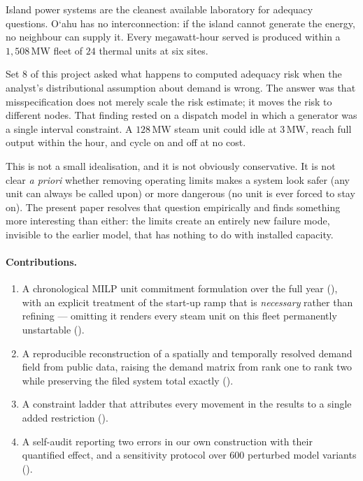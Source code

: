 \documentclass[11pt,a4paper]{article}
\theoremstyle{definition}
\theoremstyle{plain}
\theoremstyle{remark}
\newcommand{\MW}{\,\mathrm{MW}}
\newcommand{\okina}{\textquoteleft}
\newcommand{\Oahu}{O\okina ahu}
\begin{document}
Island power systems are the cleanest available laboratory for adequacy
questions. \Oahu{} has no interconnection: if the island cannot generate the
energy, no neighbour can supply it. Every megawatt-hour served is produced
within a $1{,}508\MW$ fleet of $24$ thermal units at six sites.

Set 8 of this project asked what happens to computed adequacy risk when the
analyst's distributional assumption about demand is wrong. The answer was that
misspecification does not merely scale the risk estimate; it moves the risk to
different nodes. That finding rested on a dispatch model in which a generator
was a single interval constraint. A $128\MW$ steam unit could idle at $3\MW$,
reach full output within the hour, and cycle on and off at no cost.

This is not a small idealisation, and it is not obviously conservative. It is
not clear \emph{a priori} whether removing operating limits makes a system look
safer (any unit can always be called upon) or more dangerous (no unit is ever
forced to stay on). The present paper resolves that question empirically and
finds something more interesting than either: the limits create an entirely new
failure mode, invisible to the earlier model, that has nothing to do with
installed capacity.

\paragraph{Contributions.}
\begin{enumerate}[leftmargin=1.4em,itemsep=2pt]
\item A chronological MILP unit commitment formulation over the full year
  (), with an explicit treatment of the start-up ramp that is
  \emph{necessary} rather than refining --- omitting it renders every steam unit
  on this fleet permanently unstartable ().
\item A reproducible reconstruction of a spatially and temporally resolved
  demand field from public data, raising the demand matrix from rank one to
  rank two while preserving the filed system total exactly
  ().
\item A constraint ladder that attributes every movement in the results to a
  single added restriction ().
\item A self-audit reporting two errors in our own construction with their
  quantified effect, and a sensitivity protocol over $600$ perturbed model
  variants ().
\end{enumerate}
\end{document}
